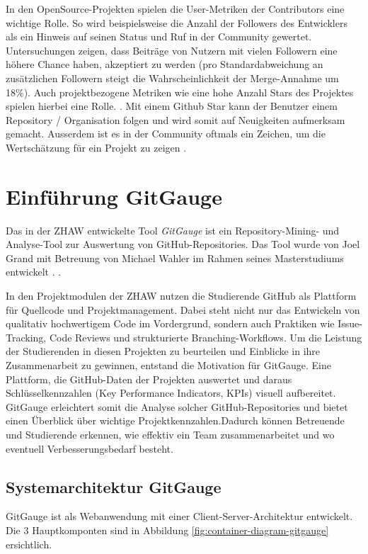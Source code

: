 In den OpenSource-Projekten spielen die User-Metriken der Contributors eine wichtige Rolle. So wird beispielsweise die Anzahl der Followers des Entwicklers als ein Hinweis auf seinen Status und Ruf in der Community gewertet. Untersuchungen zeigen, dass Beiträge von Nutzern mit vielen Followern eine höhere Chance haben, akzeptiert zu werden (pro Standardabweichung an zusätzlichen Followern steigt die Wahrscheinlichkeit der Merge-Annahme um 18\%). Auch projektbezogene Metriken wie eine hohe Anzahl Stars des Projektes spielen hierbei eine Rolle. \parencite{tsay_influence_2014}. Mit einem Github Star kann der Benutzer einem Repository / Organisation folgen und wird somit auf Neuigkeiten aufmerksam gemacht. Ausserdem ist es in der Community oftmals ein Zeichen, um die Wertschätzung für ein Projekt zu zeigen \parencite{noauthor_saving_nodate}.

\section{Einführung GitGauge}
Das in der ZHAW entwickelte Tool \textit{GitGauge} ist ein Repository-Mining- und Analyse-Tool zur Auswertung von GitHub-Repositories. Das Tool wurde von Joel Grand mit Betreuung von Michael Wahler im Rahmen seines Masterstudiums entwickelt . \parencite{grand_joel_wahler_michael_waspe_lara_stumpf_simon_repo_nodate}.

In den Projektmodulen der ZHAW nutzen die Studierende GitHub als Plattform für Quellcode und Projektmanagement. Dabei steht nicht nur das Entwickeln von qualitativ hochwertigem Code im Vordergrund, sondern auch Praktiken wie Issue-Tracking, Code Reviews und strukturierte Branching-Workflows. Um die Leistung der Studierenden in diesen Projekten zu beurteilen und Einblicke in ihre Zusammenarbeit zu gewinnen, entstand die Motivation für GitGauge. Eine Plattform, die GitHub-Daten der Projekten auswertet und daraus Schlüsselkennzahlen (Key Performance Indicators, KPIs) visuell aufbereitet. GitGauge erleichtert somit die Analyse solcher GitHub-Repositories und bietet einen Überblick über wichtige Projektkennzahlen.Dadurch können Betreuende und Studierende erkennen, wie effektiv ein Team zusammenarbeitet und wo eventuell Verbesserungsbedarf besteht. \parencite{grand_joel_vt1_joelgrand_repository_2024}

\subsection{Systemarchitektur GitGauge}
GitGauge ist als Webanwendung mit einer Client-Server-Architektur entwickelt. Die 3 Hauptkomponten sind in Abbildung \autoref{fig:container-diagram-gitgauge} ersichtlich. 

